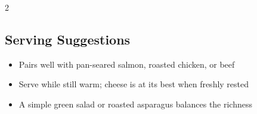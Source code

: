\documentclass[11pt,letterpaper]{article}
\begin{document}
{\begin{multicols}{2}
\subsection*{Serving Suggestions}
\begin{itemize}
    \item Pairs well with pan-seared salmon, roasted chicken, or beef
    \item Serve while still warm; cheese is at its best when freshly rested
    \item A simple green salad or roasted asparagus balances the richness
\end{itemize}

\end{multicols}
}
\end{document}
